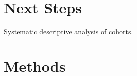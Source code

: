 \documentclass[]{article}
\begin{document}
% 
% 
% 
%                              
% 

% 

\section{Next Steps}

\noindent Systematic descriptive analysis of cohorts. \\   

\section{Methods}
\end{document}

